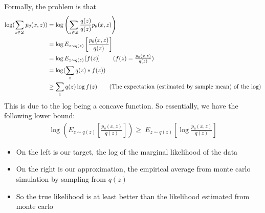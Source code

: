 Formally, the problem is that 
    \begin{align*}
        \log(\sum_{z\in \mathcal{Z}} p_\theta(x,z)) 
        &= \log \left( \sum_{z\in \mathcal{Z}} \frac{q(z)}{q(z)}p_\theta(x,z)           \right)\\
        & = \log E_{z\sim q(z)}\left[ \frac{p_\theta(x,z) }{q(z)}   \right] \\
        & = \log E_{z\sim q(z)}\left[ f(z) \right] \tag{$f(z) = \frac{p_\theta(x,z) }{q(z)}$}\\
        & = \log( \sum_z q(z)*f(z))\\
        & \geq \sum_z q(z)\log f(z) \tag{The expectation (estimated by sample mean) of the log}
    \end{align*}
This is due to the log being a concave function. So essentially, we have the following lower bound: 
    \begin{align*}
        \log \left( E_{z\sim q(z)}[\frac{p_\theta(x,z) }{q(z)}] \right) \geq \ E_{z\sim q(z)}\left[ \log \frac{p_\theta(x,z) }{q(z)}\right] 
    \end{align*}
    \begin{itemize}
        \item On the left is our target, the log of the marginal likelihood of the data 
        \item On the right is our approximation, the empirical average from monte carlo simulation by sampling from $q(z)$
        \item So the true likelihood is at least better than the likelihood estimated from monte carlo 
    \end{itemize}

